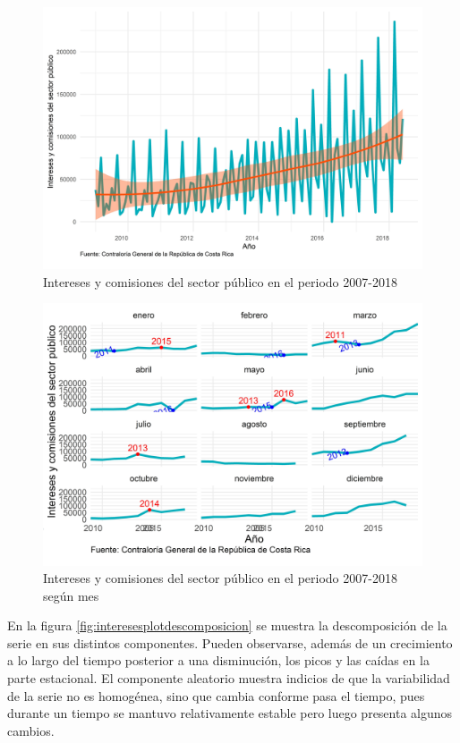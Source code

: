 \documentclass[
]{article}
\begin{document}
\begin{figure}[!h]
\includegraphics[width=1\linewidth,height=1\textheight]{Tesis_files/figure-latex/interesesplotgeneral-1} \caption{Intereses y comisiones del sector público en el periodo 2007-2018}\label{fig:interesesplotgeneral}
\end{figure}

\begin{figure}[!h]
\includegraphics[width=1\linewidth,height=1\textheight]{Tesis_files/figure-latex/interesesplotperiodos-1} \caption{Intereses y comisiones del sector público en el periodo 2007-2018 según mes}\label{fig:interesesplotperiodos}
\end{figure}

En la figura \ref{fig:interesesplotdescomposicion} se muestra la
descomposición de la serie en sus distintos componentes. Pueden
observarse, además de un crecimiento a lo largo del tiempo posterior a
una disminución, los picos y las caídas en la parte estacional. El
componente aleatorio muestra indicios de que la variabilidad de la serie
no es homogénea, sino que cambia conforme pasa el tiempo, pues durante
un tiempo se mantuvo relativamente estable pero luego presenta algunos
cambios.
\end{document}
